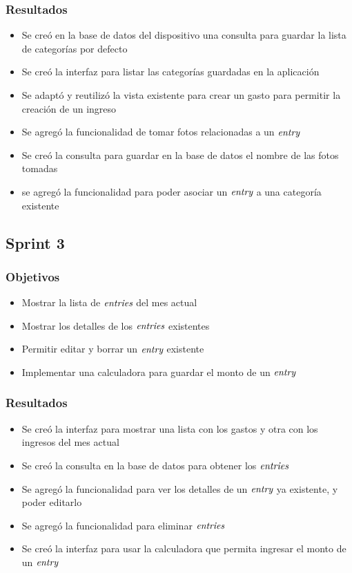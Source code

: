 \subsubsection{Resultados}
\begin{itemize}
\item Se creó en la base de datos del dispositivo una consulta para guardar la lista de categorías por defecto
\item Se creó la interfaz para listar las categorías guardadas en la aplicación
\item Se adaptó y reutilizó la vista existente para crear un gasto para permitir la creación de un ingreso
\item Se agregó la funcionalidad de tomar fotos relacionadas a un $\textit{entry}$
\item Se creó la consulta para guardar en la base de datos el nombre de las fotos tomadas
\item se agregó la funcionalidad para poder asociar un $\textit{entry}$ a una categoría existente

\end{itemize}

\subsection{Sprint 3}
\subsubsection{Objetivos}
\begin{itemize}
\item Mostrar la lista de $\textit{entries}$ del mes actual
\item Mostrar los detalles de los $\textit{entries}$ existentes
\item Permitir editar y borrar un $\textit{entry}$ existente
\item Implementar una calculadora para guardar el monto de un $\textit{entry}$
\end{itemize}

\subsubsection{Resultados}
\begin{itemize}
\item Se creó la interfaz para mostrar una lista con los gastos y otra con los ingresos del mes actual
\item Se creó la consulta en la base de datos para obtener los $\textit{entries}$
\item Se agregó la funcionalidad para ver los detalles de un $\textit{entry}$ ya existente, y poder editarlo
\item Se agregó la funcionalidad para eliminar $\textit{entries}$
\item Se creó la interfaz para usar la calculadora que permita ingresar el monto de un $\textit{entry}$
\end{itemize}


